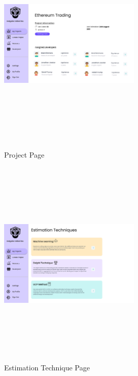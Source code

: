 \begin{figure}[H]
\includegraphics[height=10cm, width=0.6\textwidth]{./images/prototype/0004}
\centering 
\caption{Project Page}
\label{fig:prototype1}

\includegraphics[height=10cm, width=0.6\textwidth]{./images/prototype/0011}
\centering 
\caption{Estimation Technique Page}
\label{fig:prototype1}
\end{figure}

